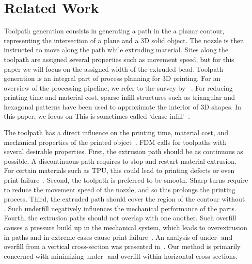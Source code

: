 \section{Related Work}

Toolpath generation consists in generating a path in the a planar contour, representing the intersection of a plane and a 3D solid object.
The nozzle is then instructed to move along the path while extruding material.
Sites along the toolpath are assigned several properties such as movement speed, but for this paper we will focus on the assigned width of the extruded bead.
Toolpath generation is an integral part of process planning for 3D printing.
For an overview of the processing pipeline, we refer to the survey by \citeauthor{Livesu2017CGF}~\cite{Livesu2017CGF}.
For reducing printing time and material cost, sparse infill structures such as triangular and hexagonal patterns have been used to approximate the interior of 3D shapes.
In this paper, we focus on 
This is sometimes called `dense infill'~\cite{Livesu2017CGF}.

The toolpath has a direct influence on the printing time, material cost, and mechanical properties of the printed object~\cite{N.Turner2014,ahn2002anisotropic}.
FDM calls for toolpaths with several desirable properties.
First, the extrusion path should be as continuous as possible.
A discontinuous path requires to stop and restart material extrusion.
For certain materials\revise{}{,} such as TPU, this could lead to printing defects or even print failure~\cite{KUIPERS2019CAD}.
Second, the toolpath is preferred to be smooth.
Sharp turns require to reduce the movement speed of the nozzle, and so this prolongs the printing process.
Third, the extruded path should cover the region of the contour without .
Such underfill negatively influences the mechanical performance of the parts.
Fourth, the extrusion paths should not overlap with one another.
Such overfill causes a pressure build up in the mechanical system, which leads to overextrusion in  paths and in extreme cases cause print failure~\cite{KUIPERS2019CAD}.
An analysis of under- and overfill from a vertical cross-section was presented in~\cite{Han2002JMSE}. 
Our method is primarily concerned with minimizing under- and overfill within horizontal cross-sections.


